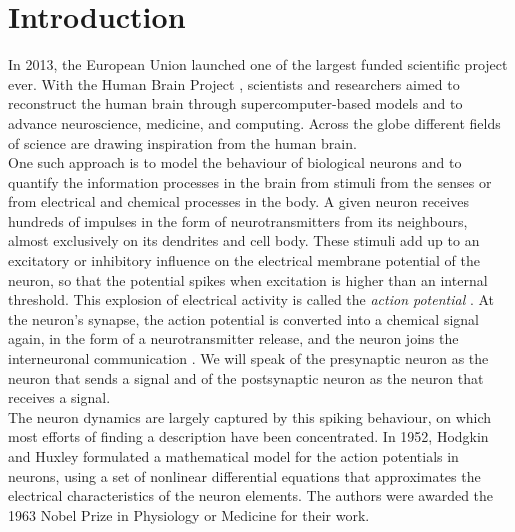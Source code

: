 \newpage
\section{Introduction} \label{sec:Introduction}
In 2013, the European Union launched one of the largest funded scientific project ever. With the Human Brain Project \cite{humanbrainproject}, scientists and researchers aimed to reconstruct the human brain through supercomputer-based models and to advance neuroscience, medicine, and computing. Across the globe different fields of science are drawing inspiration from the human brain. \\

One such approach is to model the behaviour of biological neurons and to quantify the information processes in the brain from stimuli from the senses or from electrical and chemical processes in the body. A given neuron receives hundreds of impulses in the form of neurotransmitters from its neighbours, almost exclusively on its dendrites and cell body. These stimuli add up to an excitatory or inhibitory influence on the electrical membrane potential of the neuron, so that the potential spikes when excitation is higher than an internal threshold. This explosion of electrical activity is called the \textsl{action potential} \cite{IntroductionModelingDynamics}. At the neuron's synapse, the action potential is converted into a chemical signal again, in the form of a neurotransmitter release, and the neuron joins the interneuronal communication \cite{ActionPotentialsAndSynapses}. %
We will speak of the presynaptic neuron as the neuron that sends a signal and of the postsynaptic neuron as the neuron that receives a signal. \\



The neuron dynamics are largely captured by this spiking behaviour, on which most efforts of finding a description have been concentrated.
In 1952, Hodgkin and Huxley formulated a mathematical model for the action potentials in neurons, using a set of nonlinear differential equations that approximates the electrical characteristics of the neuron elements. The authors were awarded the 1963 Nobel Prize in Physiology or Medicine \cite{nobel1963} for their work.\\

